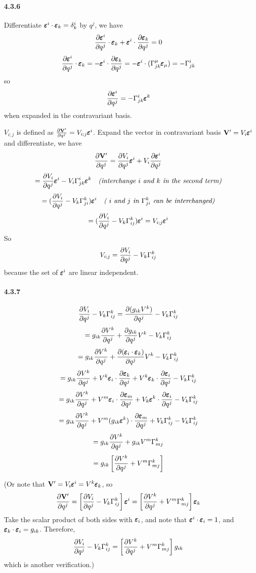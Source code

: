 \documentclass[a4paper]{article}
\begin{document}
\paragraph{4.3.6}
Differentiate $\EE^i\cdot\EE_k=\delta^i_k$ by $q^j$, we have
\[
\pdv{\EE^i}{q^j}\cdot\EE_k+\EE^i\cdot\pdv{\EE_k}{q^j}=0
\]
\[
\pdv{\EE^i}{q^j}\cdot\EE_k=-\EE^i\cdot\pdv{\EE_k}{q^j}=-\EE^i\cdot(\Gamma^\mu_{jk}\EE_\mu)=-\Gamma^i_{jk}
\]
so
\[
\pdv{\EE^i}{q^j}=-\Gamma^i_{jk}\EE^k
\]
when expanded in the contravariant basis.

$V_{i;j}$ is defined as $\pdv{\V{V}'}{q^j}=V_{i;j}\EE^i$. Expand the vector in contravariant basis $\V{V'}=V_i\EE^i$ and differentiate, we have
\[
\pdv{\V{V'}}{q^j}=\pdv{V_i}{q^j}\EE^i+V_i\pdv{\EE^i}{q^j}
\]
\[
=\pdv{V_i}{q^j}\EE^i-V_i\Gamma^i_{jk}\EE^k\quad\textit{(interchange $i$ and $k$ in the second term)}
\]
\[
=(\pdv{V_i}{q^j}-V_k\Gamma^k_{ji})\EE^i\quad\textit{( $i$ and $j$ in $\Gamma^k_{ji}$ can be interchanged)}
\]
\[
=(\pdv{V_i}{q^j}-V_k\Gamma^k_{ij})\EE^i=V_{i;j}\EE^i
\]
So
\[
V_{i;j}=\pdv{V_i}{q^j}-V_k\Gamma^k_{ij}
\]
because the set of $\EE^i$ are linear independent.

\paragraph{4.3.7}
\[
\pdv{V_i}{q^j}-V_k\Gamma^k_{ij}=\pdv{(g_{ik}V^k)}{q^j}-V_k\Gamma^k_{ij}
\]
\[
=g_{ik}\pdv{V^k}{q^j}+\pdv{g_{ik}}{q^j}V^k-V_k\Gamma^k_{ij}
\]
\[
=g_{ik}\pdv{V^k}{q^j}+\pdv{(\EE_i\cdot\EE_k)}{q^j}V^k-V_k\Gamma^k_{ij}
\]
\[
=g_{ik}\pdv{V^k}{q^j}+V^k\EE_i\cdot\pdv{\EE_k}{q^j}+V^k\EE_k\cdot\pdv{\EE_i}{q^j}-V_k\Gamma^k_{ij}
\]
\[
=g_{ik}\pdv{V^k}{q^j}+V^m\EE_i\cdot\pdv{\EE_m}{q^j}+V_k\EE^k\cdot\pdv{\EE_i}{q^j}-V_k\Gamma^k_{ij}
\]
\[
=g_{ik}\pdv{V^k}{q^j}+V^m(g_{ik}\EE^k)\cdot\pdv{\EE_m}{q^j}+V_k\Gamma^k_{ij}-V_k\Gamma^k_{ij}
\]
\[
=g_{ik}\pdv{V^k}{q^j}+g_{ik}V^m\Gamma^k_{mj} 
\]
\[
=g_{ik}\left[\pdv{V^k}{q^j}+V^m\Gamma^k_{mj} \right]
\]

\noindent
(Or note that $\V{V'}=V_i\EE^i=V^k\EE_k$, so
\[
\pdv{\V{V'}}{q^j}=\left[\pdv{V_i}{q^j}-V_k\Gamma^k_{ij} \right]\EE^i=\left[\pdv{V^k}{q^j}+V^m\Gamma^k_{mj} \right]\EE_k
\]
Take the scalar product of both sides with $\EE_i$, and note that $\EE^i\cdot\EE_i=1$, and $\EE_k\cdot\EE_i=g_{ik}$. Therefore,
\[
\pdv{V_i}{q^j}-V_k\Gamma^k_{ij}=\left[\pdv{V^k}{q^j}+V^m\Gamma^k_{mj} \right]g_{ik}
\]
which is another verification.)
\end{document}
